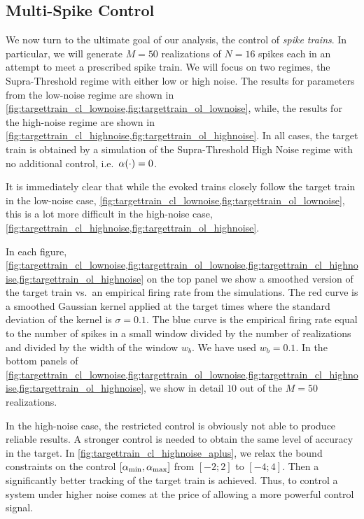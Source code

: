 \documentclass[12pt]{iopart}
\begin{document}
\subsection{Multi-Spike Control}
We now turn to the ultimate goal of our analysis, the control of {\sl spike
trains}. In particular, we will generate $M=50$ realizations of $N=16$ spikes
each in an attempt to meet a prescribed spike train. We will focus on two
regimes, the Supra-Threshold regime with either low or high noise. The results
for parameters from the low-noise regime are shown in
\cref{fig:targettrain_cl_lownoise,fig:targettrain_ol_lownoise}, while, the
results for the high-noise regime are shown in
\cref{fig:targettrain_cl_highnoise,fig:targettrain_ol_highnoise}. In all cases,
the target train is obtained by a simulation of the Supra-Threshold High Noise
regime with no additional control, i.e.\ ${\alpha}(\cdot) = 0$.

It is immediately clear that while the evoked trains closely follow the target
train in the low-noise case,
\cref{fig:targettrain_cl_lownoise,fig:targettrain_ol_lownoise}, this is a lot
more difficult in the high-noise case,
\cref{fig:targettrain_cl_highnoise,fig:targettrain_ol_highnoise}.

In each figure,
\cref{fig:targettrain_cl_lownoise,fig:targettrain_ol_lownoise,fig:targettrain_cl_highnoise,fig:targettrain_ol_highnoise}
on the top panel we show a smoothed version of the target train vs.\ an
empirical firing rate from the simulations. The red curve is a smoothed Gaussian
kernel applied at the target times where the standard deviation of the kernel is
$\sigma = 0.1$. The blue curve is the empirical firing rate equal to the number
of spikes in a small window divided by the number of realizations and divided by
the width of the window $w_b$. We have used $w_b = 0.1$. In the bottom panels of
\cref{fig:targettrain_cl_lownoise,fig:targettrain_ol_lownoise,fig:targettrain_cl_highnoise,fig:targettrain_ol_highnoise},
we show in detail $10$ out of the $M=50$ realizations.

In the high-noise case, the restricted control is obviously not able to produce
reliable results. A stronger control is needed to obtain the same level of
accuracy in the target. In \cref{fig:targettrain_cl_highnoise_aplus}, we relax
the bound constraints on the control $[{ {\alpha}_{\textrm{min}} }, { {\alpha}_{\textrm{max}} }]$ from $[-2; 2]$ to $[-4;
4]$. Then a significantly better tracking of the target train is achieved. Thus,
to control a system under higher noise comes at the price of allowing a more
powerful control signal.
\end{document}
